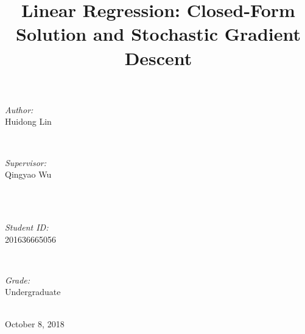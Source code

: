\documentclass[journal, a4paper]{IEEEtran}
\begin{document}
\begin{titlepage}
\begin{minipage}{0.4\textwidth}
\begin{flushleft} \large
\emph{Author:}\\
Huidong Lin %
\end{flushleft}
\end{minipage}
~
\begin{minipage}{0.4\textwidth}
\begin{flushright} \large
\emph{Supervisor:} \\
Qingyao Wu %
\end{flushright}
\end{minipage}\\[2cm]
~
\begin{minipage}{0.4\textwidth}
\begin{flushleft} \large
\emph{Student ID:}\\
201636665056
\end{flushleft}
\end{minipage}
~
\begin{minipage}{0.4\textwidth}
\begin{flushright} \large
\emph{Grade:} \\
Undergraduate
\end{flushright}
\end{minipage}\\[2cm]



{\large October 8, 2018}\\[2cm] %

 

\vfill %

\end{titlepage}

	\title{Linear Regression: Closed-Form Solution and Stochastic Gradient Descent}
	\maketitle
\end{document}
